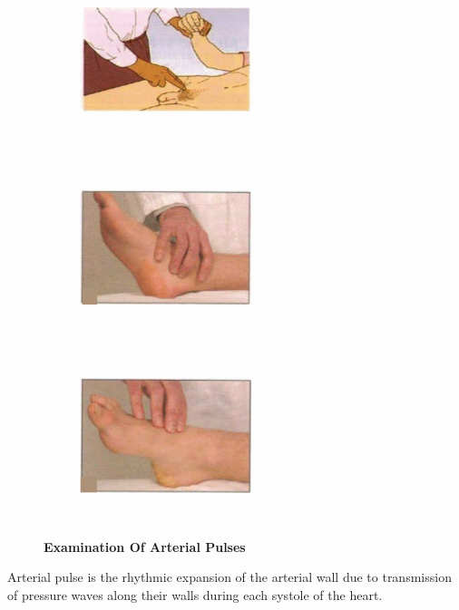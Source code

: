 \documentclass[a4paper,12pt,openany,twoside]{book}
\begin{document}
{\begin{figure}[H]
\begin{subfigure}[t]{.29\textwidth}
			\label{collapsingPulse}
		\end{subfigure}
		\begin{subfigure}[t]{.29\textwidth}
			\includegraphics[height=5cm, width=5cm]{./clinicalPhysioPic/radioFemoralDelay.jpg}
			\label{radioFemoralDelay}
		\end{subfigure}
		\hspace{\fill}
		\begin{subfigure}[t]{.29\textwidth}
			\includegraphics[height=5cm, width=5cm]{./clinicalPhysioPic/posteriorTibial.jpg}
			\label{posteriorTibial}
		\end{subfigure}
		\hspace{\fill}
		\begin{subfigure}[t]{.29\textwidth}
			\includegraphics[height=5cm,width=5cm]{./clinicalPhysioPic/dorsalisPedis.jpg}
			\label{dorsalisPedis}
		\end{subfigure}
		
		\caption*{\textbf{Examination Of Arterial Pulses}}
		\label{arterialPulses}
	\end{figure}
	}
Arterial pulse is the rhythmic expansion of the arterial wall due to transmission of pressure waves along their walls during each systole of the heart.
\end{document}
